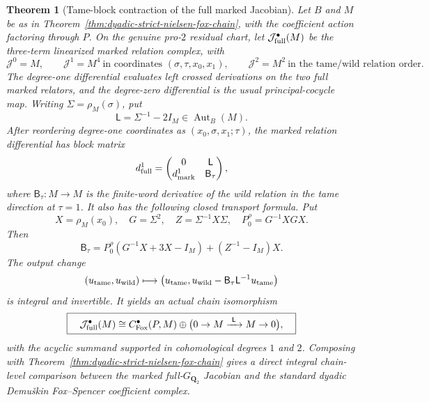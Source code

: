 \documentclass[11pt]{article}
\newtheorem{theorem}{Theorem}[section]
\theoremstyle{definition}
\begin{document}
\begin{theorem}[Tame-block contraction of the full marked Jacobian]
\label{thm:dyadic-tame-jacobian-fox-splitting}
Let $B$ and $M$ be as in
Theorem~\ref{thm:dyadic-strict-nielsen-fox-chain},
with the coefficient action factoring through $P$.
On the genuine pro-$2$ residual chart,
let $\mathcal J^\bullet_{\rm full}(M)$ be
the three-term \emph{linearized marked
relation complex}, with
\[
\mathcal J^0=M,\qquad
\mathcal J^1=M^4
\ \text{in coordinates }(\sigma,\tau,x_0,x_1),
\qquad
\mathcal J^2=M^2
\ \text{in the tame/wild relation order}.
\]
The degree-one differential evaluates
left crossed derivations on the
two full marked relators, and the
degree-zero differential is the
usual principal-cocycle map.
Writing $\Sigma=\rho_M(\sigma)$,
put
\begin{equation}\label{eq:dyadic-tame-L-unit}
\mathsf L=\Sigma^{-1}-2I_M
\in\operatorname{Aut}_B(M).
\end{equation}
After reordering degree-one coordinates as
$(x_0,\sigma,x_1;\tau)$, the marked
relation differential has block matrix
\begin{equation}\label{eq:dyadic-full-jacobian-block}
d^1_{\rm full}
=
\begin{pmatrix}
 0&\mathsf L\\
 d^1_{\rm mark}&\mathsf B_\tau
\end{pmatrix},
\end{equation}
where $\mathsf B_\tau:M\to M$ is the
finite-word derivative of the wild
relation in the tame direction at
$\tau=1$.  It also has the following
\emph{closed transport formula}.  Put
\[
X=\rho_M(x_0),\quad
G=\Sigma^2,\quad
Z=\Sigma^{-1}X\Sigma,\quad
P_0^\rho=G^{-1}XGX.
\]
Then
\begin{equation}\label{eq:dyadic-wild-tau-jacobian-closed}
\boxed{\quad
\mathsf B_\tau
=P_0^\rho(G^{-1}X+3X-I_M)
 +(Z^{-1}-I_M)X.
\quad}
\end{equation}
The output change
\begin{equation}\label{eq:dyadic-tame-row-elimination}
(u_{\rm tame},u_{\rm wild})
\longmapsto
\bigl(u_{\rm tame},
u_{\rm wild}-\mathsf B_\tau\mathsf L^{-1}u_{\rm tame}\bigr)
\end{equation}
is integral and invertible.
It yields an actual chain isomorphism
\begin{equation}\label{eq:dyadic-full-marked-chain-splitting}
\boxed{\quad
\mathcal J^\bullet_{\rm full}(M)
\cong
C^\bullet_{\rm Fox}(P,M)
\oplus
\bigl(0\to M
  \xrightarrow{\ \mathsf L\ }M\to0\bigr),
\quad}
\end{equation}
with the acyclic summand supported in
cohomological degrees $1$ and $2$.
Composing with
Theorem~\ref{thm:dyadic-strict-nielsen-fox-chain}
gives a \emph{direct integral chain-level
comparison} between the marked
full-$G_{\mathbf Q_2}$ Jacobian and the
standard dyadic Demu\v{s}kin Fox--Spencer
coefficient complex.


\end{theorem}
\end{document}
